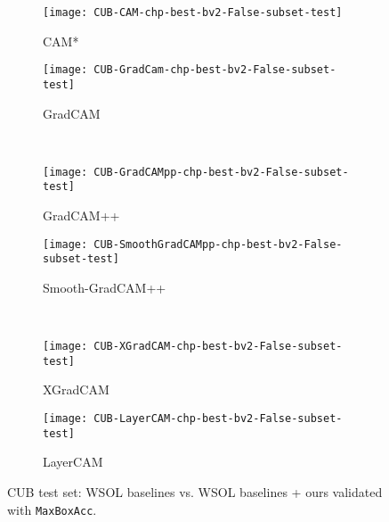 \documentclass[twocolumn]{article}
\newcommand\maxboxacc{\texttt{MaxBoxAcc}\xspace}
\theoremstyle{definition}
\begin{document}
\begin{figure*}
     \centering
     \begin{subfigure}[b]{0.49\textwidth}
         \centering
         \texttt{[image: CUB-CAM-chp-best-bv2-False-subset-test]}
         \caption{CAM*}
         \label{fig:cub-06}
     \end{subfigure}
     \hfill
     \begin{subfigure}[b]{0.49\textwidth}
         \centering
         \texttt{[image: CUB-GradCam-chp-best-bv2-False-subset-test]}
         \caption{GradCAM}
         \label{fig:cub-05}
     \end{subfigure}
     \\
     \begin{subfigure}[b]{0.49\textwidth}
         \centering
         \texttt{[image: CUB-GradCAMpp-chp-best-bv2-False-subset-test]}
         \caption{GradCAM++}
         \label{fig:cub-04}
     \end{subfigure}
     \begin{subfigure}[b]{0.49\textwidth}
         \centering
         \texttt{[image: CUB-SmoothGradCAMpp-chp-best-bv2-False-subset-test]}
         \caption{Smooth-GradCAM++}
         \label{fig:cub-03}
     \end{subfigure}
     \\
     \begin{subfigure}[b]{0.49\textwidth}
         \centering
         \texttt{[image: CUB-XGradCAM-chp-best-bv2-False-subset-test]}
         \caption{XGradCAM}
         \label{fig:cub-02}
     \end{subfigure}
     \hfill
     \begin{subfigure}[b]{0.49\textwidth}
         \centering
         \texttt{[image: CUB-LayerCAM-chp-best-bv2-False-subset-test]}
         \caption{LayerCAM}
         \label{fig:cub-01}
     \end{subfigure}
        \caption{CUB test set: WSOL baselines vs. WSOL baselines + ours  validated with \maxboxacc.}
        \label{fig:ours-vs-baselines-perf-cub}
\end{figure*}
\end{document}
